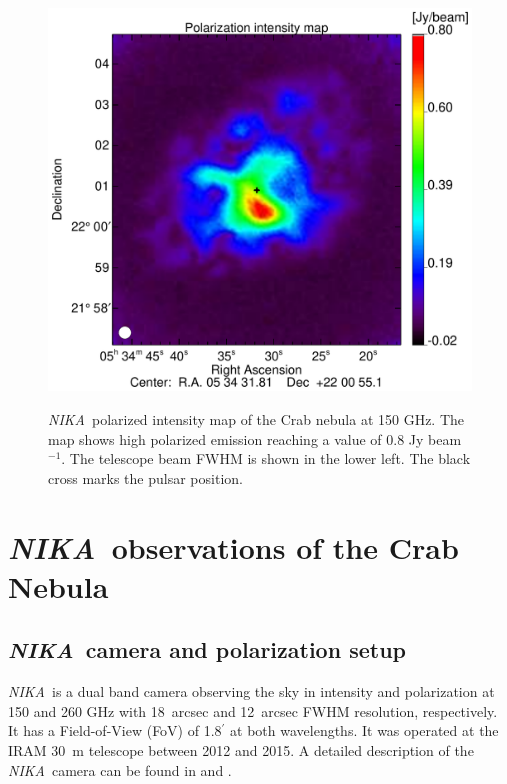 \documentclass[twocolumn,traditabstract]{aa}
\def\NIKA{\textit{NIKA}}
\begin{document}
 \begin{figure}
  \centering
      {\includegraphics[width=0.75\linewidth,keepaspectratio]{figures/Crab_ipol_v3_2mm.pdf}}
\caption{\NIKA\ polarized intensity map of the  Crab nebula at 150 GHz. The map shows high polarized emission reaching a value of 0.8 Jy beam$^{-1}$. The telescope beam FWHM is shown in the lower left. The black cross marks the pulsar position.}
\label{crab_ipol_maps}		
  \end{figure}
 

\section{\NIKA\ observations of the Crab Nebula}\label{sec:NIKA observations}
\subsection{\NIKA\ camera and polarization setup}\label{sec:nika camera}
\NIKA\ is a dual band camera observing the sky in intensity and polarization at
150 and 260 GHz with 18~arcsec and 12~arcsec FWHM resolution, respectively. It
has a Field-of-View (FoV) of 1.8$^{\prime}$ at both wavelengths. It was operated at the
IRAM 30~m telescope between 2012 and 2015. A detailed description of the
\NIKA\ camera can be found in \citet{monfardini2010, monfardini2011} and
\citet{catalano2014}.
\end{document}
